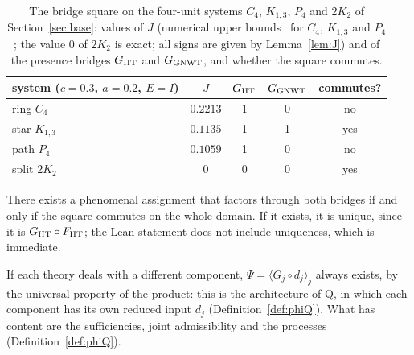 \begin{table}[htbp]\centering
\begin{tabular}{lcccc}
\toprule
system ($c=0.3$, $a=0.2$, $E=I$) & $J$ & $G_{\rm IIT}$ & $G_{\rm GNWT}$ & commutes?\\
\midrule
ring $C_4$ & $0.2213$ & 1 & 0 & no\\
star $K_{1,3}$ & $0.1135$ & 1 & 1 & yes\\
path $P_4$ & $0.1059$ & 1 & 0 & no\\
split $2K_2$ & $0$ & 0 & 0 & yes\\
\bottomrule
\end{tabular}
\caption{The bridge square on the four-unit systems $C_4$, $K_{1,3}$, $P_4$ and $2K_2$ of Section~\ref{sec:base}: values of $J$ (numerical upper bounds \stN\ for $C_4$, $K_{1,3}$ and $P_4$; the value $0$ of $2K_2$ is exact; all signs are given by Lemma~\ref{lem:J}) and of the presence bridges $G_{\rm IIT}$ and $G_{\rm GNWT}$, and whether the square commutes.}\label{tab:C-1}
\end{table}

\begin{theorem}\label{thm:bridge}
There exists a phenomenal assignment that factors through both bridges if and only if the square commutes on the whole domain. If it exists, it is unique, since it is $G_{\rm IIT}\circ F_{\rm IIT}$; the Lean statement does not include uniqueness, which is immediate.
\end{theorem}
If each theory deals with a different component, $\Psi=\langle G_j\circ d_j\rangle_j$ always exists, by the universal property of the product: this is the architecture of Q, in which each component has its own reduced input $d_j$ (Definition~\ref{def:phiQ}). What has content are the sufficiencies, joint admissibility and the processes (Definition~\ref{def:phiQ}).

